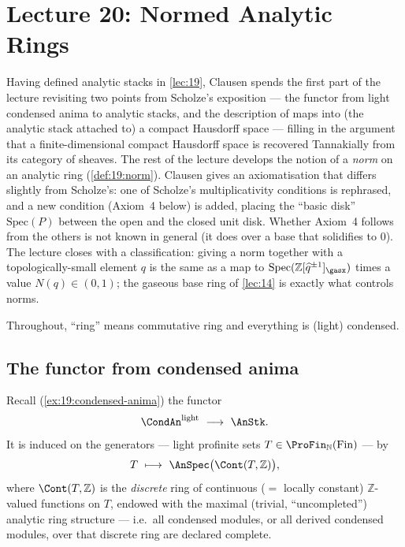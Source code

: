 \section{Lecture 20: Normed Analytic Rings}
\label{lec:20}

Having defined analytic stacks in \cref{lec:19}, Clausen spends the first part
of the lecture revisiting two points from Scholze's exposition --- the functor
from light condensed anima to analytic stacks, and the description of maps into
(the analytic stack attached to) a compact Hausdorff space --- filling in the
argument that a finite-dimensional compact Hausdorff space is recovered
Tannakially from its category of sheaves. The rest of the lecture develops the
notion of a \emph{norm} on an analytic ring (\cref{def:19:norm}). Clausen gives
an axiomatisation that differs slightly from Scholze's: one of Scholze's
multiplicativity conditions is rephrased, and a new condition (Axiom~4 below)
is added, placing the ``basic disk'' $\mathrm{Spec}(P)$ between the open and the
closed unit disk. Whether Axiom~4 follows from the others is not known in
general (it does over a base that solidifies to $0$). The lecture closes with a
classification: giving a norm together with a topologically-small element $q$ is
the same as a map to $\mathrm{Spec}(\mathbb{Z}[\widehat q^{\pm1}]_\gasx)$ times a
value $N(q)\in(0,1)$; the gaseous base ring of \cref{lec:14} is exactly what
controls norms.

Throughout, ``ring'' means commutative ring and everything is (light)
condensed.

\subsection{The functor from condensed anima}
\label{subsec:20:condensed-anima}

Recall (\cref{ex:19:condensed-anima}) the functor
\begin{equation}
\label{eq:20:condan-to-anstk}
\CondAn^{\mathrm{light}}\ \longrightarrow\ \AnStk .
\end{equation}
It is induced on the generators --- light profinite sets $T\in
\ProFin_{\mathbb N}(\mathrm{Fin})$ --- by
\begin{equation}
\label{eq:20:T-to-spec}
T\ \longmapsto\ \AnSpec\bigl(\Cont(T,\mathbb Z)\bigr),
\end{equation}
where $\Cont(T,\mathbb Z)$ is the \emph{discrete} ring of continuous
($=$ locally constant) $\mathbb Z$-valued functions on $T$, endowed with the
maximal (trivial, ``uncompleted'') analytic ring structure --- i.e.\ all
condensed modules, or all derived condensed modules, over that discrete ring are
declared complete.

